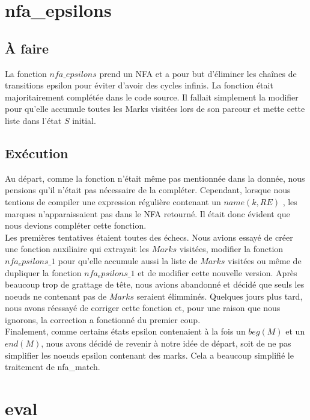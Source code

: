 \documentclass{article}
\begin{document}
 
\section{nfa\_epsilons}
\subsection{À faire}

    La fonction $nfa\_epsilons$ prend un NFA et a pour but d'éliminer les chaînes 
    de transitions epsilon pour éviter d'avoir des cycles infinis. La fonction 
    était majoritairement complétée dans le code source. 
    Il fallait simplement la modifier pour qu'elle accumule toutes les Marks 
    visitées lors de son parcour et mette cette liste dans l'état $S$ initial.

\subsection{Exécution}
    Au départ, comme la fonction n'était même pas mentionnée dans la donnée, 
    nous pensions qu'il n'était pas nécessaire de la compléter. Cependant, 
    lorsque nous tentions de compiler une expression régulière contenant un 
    $name(k, RE)$ , les marques n'apparaissaient pas dans le NFA retourné. 
    Il était donc évident que nous devions compléter cette fonction. \\
    Les premières tentatives étaient toutes des échecs. Nous avions essayé de 
    créer une fonction auxiliaire qui extrayait les $Marks$ visitées, modifier 
    la fonction $nfa_epsilons\_1$ pour qu'elle accumule aussi la liste de $Marks$ 
    visitées ou même de dupliquer la fonction $nfa_epsilons\_1$ et de modifier 
    cette nouvelle version. Après beaucoup trop de grattage de tête, nous 
    avions abandonné et décidé que seuls les noeuds ne contenant pas de 
    $Marks$ seraient élimminés. Quelques jours plus tard, nous avons réessayé 
    de corriger cette fonction et, pour une raison que nous ignorons, la 
    correction a fonctionné du premier coup. \\
    Finalement, comme certains états epsilon contenaient à la fois un $beg(M)$
    et un $end(M)$, nous avons décidé de revenir à notre idée de départ, soit 
    de ne pas simplifier les noeuds epsilon contenant des marks. Cela a beaucoup
    simplifié le traitement de nfa_match.
    
    
    
\section{eval}
\end{document}
